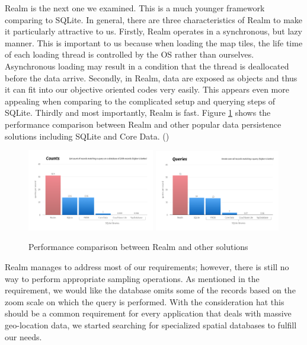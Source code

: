 \documentclass[12pt,a4paper]{article}
\begin{document}
            Realm is the next one we examined. This is a much younger framework comparing to SQLite. In general, there are three characteristics of Realm to make it particularly attractive to us. Firstly, Realm operates in a synchronous, but lazy manner. This is important to us because when loading the map tiles, the life time of each loading thread is controlled by the OS rather than ourselves. Asynchronous loading may result in a condition that the thread is deallocated before the data arrive. Secondly, in Realm, data are exposed as objects and thus it can fit into our objective oriented codes very easily. This appears even more appealing when comparing to the complicated setup and querying steps of SQLite. Thirdly and most importantly, Realm is fast. Figure \ref{fig:database-performance} shows the performance comparison between Realm and other popular data persistence solutions including SQLite and Core Data. (\citet{DatabasePerformanceFigure})
            
            
            \begin{figure}
                \includegraphics[width=0.495\textwidth]{4-2-1-a}
                \includegraphics[width=0.49\textwidth]{4-2-1-b}
                \centering
                \caption{Performance comparison between Realm and other solutions}
                \label{fig:database-performance}
            \end{figure}
            
            Realm manages to address most of our requirements; however, there is still no way to perform appropriate sampling operations. As mentioned in the requirement, we would like the database omits some of the records based on the zoom scale on which the query is performed. With the consideration hat this should be a common requirement for every application that deals with massive geo-location data, we started searching for specialized spatial databases to fulfill our needs.
            
\end{document}

